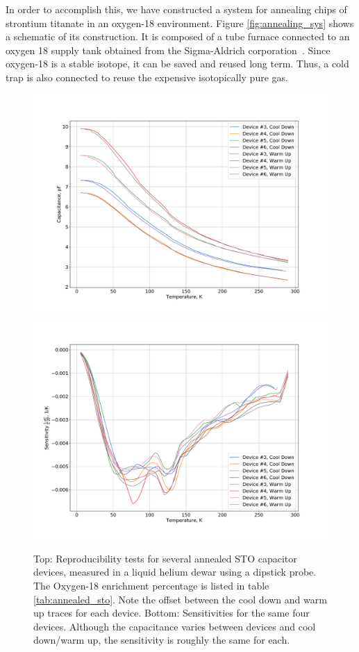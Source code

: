 \documentclass{thesis-umich}
\begin{document}
In order to accomplish this, we have constructed a system for annealing chips of strontium titanate in an oxygen-18 environment. Figure \ref{fig:annealing_sys} shows a schematic of its construction. It is composed of a tube furnace connected to an oxygen 18 supply tank obtained from the Sigma-Aldrich corporation~\cite{Sigma18O}. Since oxygen-18 is a stable isotope, it can be saved and reused long term. Thus, a cold trap is also connected to reuse the expensive isotopically pure gas.

\begin{figure} \caption[Annealed STO thermometer reproducability tests]{Top: Reproducibility tests for several annealed STO
	capacitor devices, measured in a liquid helium dewar using a dipstick
	probe. The Oxygen-18 enrichment percentage is listed in table \ref{tab:annealed_sto}. Note the
offset between the cool down and warm up traces for each device. Bottom:
Sensitivities for the same four devices. Although the capacitance varies
between devices and cool down/warm up, the sensitivity is roughly the same for
each.} \includegraphics[width=0.9\columnwidth]{figures/annealed_sto_c_vs_t.pdf}
\includegraphics[width=0.9\columnwidth]{figures/annealed_sto_sens_vs_t.pdf}
\end{figure}
\end{document}
